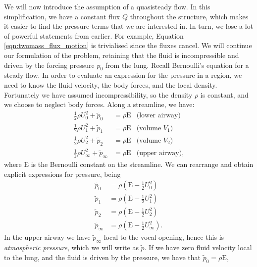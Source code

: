 We will now introduce the assumption of a quasisteady flow.
In this simplification, we have a constant flux $Q$ throughout the structure,
which makes it easier to find the pressure terms that we are interested in.
In turn, we lose a lot of powerful statements from earlier.
For example, Equation \ref{eqn:twomass_flux_motion} is trivialised since the fluxes cancel.
We will continue our formulation of the problem,
retaining that the fluid is incompressible and driven by the forcing pressure $p_0$ from the lung.
Recall Bernoulli's equation for a steady flow.
In order to evaluate an expression for the pressure in a region,
we need to know the fluid velocity, the body forces, and the local density.
Fortunately we have assumed incompressibility, so the density $\rho$ is constant,
and we choose to neglect body forces.
Along a streamline, we have:
\begin{equation}
    \begin{aligned}
        \frac{1}{2}\rho U_0^2 + \tilde{p}_0 &= \rho\mathrm{E} &\text{(lower airway)}\\
        \frac{1}{2}\rho U_1^2 + \tilde{p}_1 &= \rho\mathrm{E} &\text{(volume $V_1$)}  \\
        \frac{1}{2}\rho U_2^2 + \tilde{p}_2 &= \rho\mathrm{E} &\text{(volume $V_2$)}  \\
        \frac{1}{2}\rho U_\infty^2 + \tilde{p}_\infty &= \rho\mathrm{E} &\text{(upper airway)},
    \end{aligned}
\end{equation}
where $\mathrm{E}$ is the Bernoulli constant on the streamline.
We can rearrange and obtain explicit expressions for pressure, being
\begin{equation}
    \begin{aligned}
        \tilde{p}_0 &= \rho\left(\mathrm{E} - \frac{1}{2}U_0^2\right) \\
        \tilde{p}_1 &= \rho\left(\mathrm{E} - \frac{1}{2}U_1^2\right) \\
        \tilde{p}_2 &= \rho\left(\mathrm{E} - \frac{1}{2}U_2^2\right) \\
        \tilde{p}_\infty &= \rho\left(\mathrm{E} - \frac{1}{2}U_\infty^2\right).
    \end{aligned}
\end{equation}
In the upper airway we have $\tilde{p}_\infty$ local to the vocal opening,
hence this is \textit{atmospheric pressure}, which we will write as \({\tilde{p}}\).
If we have zero fluid velocity local to the lung, and the fluid is driven by the pressure,
we have that $\tilde{p}_0 = \rho \mathrm{E}$,

